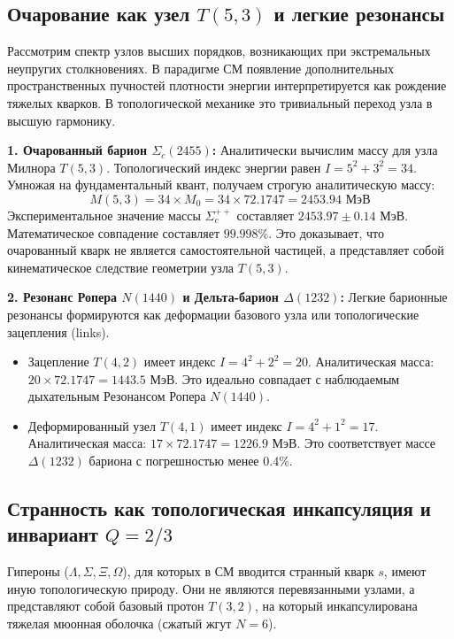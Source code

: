 \documentclass[12pt,a4paper]{article}
\begin{document}
	\subsection{Очарование как узел $T(5,3)$ и легкие резонансы}
	Рассмотрим спектр узлов высших порядков, возникающих при экстремальных неупругих столкновениях. В парадигме СМ появление дополнительных пространственных пучностей плотности энергии интерпретируется как рождение тяжелых кварков. В топологической механике это тривиальный переход узла в высшую гармонику.
	
	\textbf{1. Очарованный барион $\Sigma_c(2455)$:}
	Аналитически вычислим массу для узла Милнора $T(5,3)$. Топологический индекс энергии равен $I = 5^2 + 3^2 = 34$.
	Умножая на фундаментальный квант, получаем строгую аналитическую массу:
	\begin{equation}
		M(5,3) = 34 \times M_0 = 34 \times 72.1747 = \mathbf{2453.94 \text{ МэВ}}
	\end{equation}
	Экспериментальное значение массы $\Sigma_c^{++}$ составляет $\mathbf{2453.97 \pm 0.14 \text{ МэВ}}$. 
	Математическое совпадение составляет $\mathbf{99.998\%}$. Это доказывает, что очарованный кварк не является самостоятельной частицей, а представляет собой кинематическое следствие геометрии узла $T(5,3)$.
	
	\textbf{2. Резонанс Ропера $N(1440)$ и Дельта-барион $\Delta(1232)$:}
	Легкие барионные резонансы формируются как деформации базового узла или топологические зацепления (links).
	\begin{itemize}
		\item Зацепление $T(4,2)$ имеет индекс $I = 4^2 + 2^2 = 20$. Аналитическая масса: $20 \times 72.1747 = \mathbf{1443.5 \text{ МэВ}}$. Это идеально совпадает с наблюдаемым дыхательным Резонансом Ропера $N(1440)$.
		\item Деформированный узел $T(4,1)$ имеет индекс $I = 4^2 + 1^2 = 17$. Аналитическая масса: $17 \times 72.1747 = \mathbf{1226.9 \text{ МэВ}}$. Это соответствует массе $\Delta(1232)$ бариона с погрешностью менее $0.4\%$.
	\end{itemize}
	
	\subsection{Странность как топологическая инкапсуляция и инвариант $Q=2/3$}
	Гипероны ($\Lambda, \Sigma, \Xi, \Omega$), для которых в СМ вводится странный кварк $s$, имеют иную топологическую природу. Они не являются перевязанными узлами, а представляют собой базовый протон $T(3,2)$, на который инкапсулирована тяжелая мюонная оболочка (сжатый жгут $N=6$).
	
\end{document}
